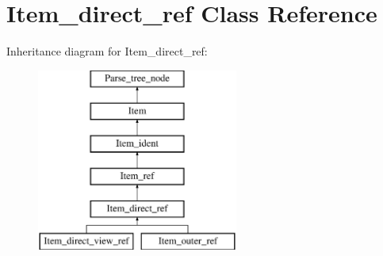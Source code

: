 \hypertarget{classItem__direct__ref}{}\section{Item\+\_\+direct\+\_\+ref Class Reference}
\label{classItem__direct__ref}
Inheritance diagram for Item\+\_\+direct\+\_\+ref\+:\begin{figure}[H]
\begin{center}
\leavevmode
\includegraphics[height=6.000000cm]{classItem__direct__ref}
\end{center}
\end{figure}
